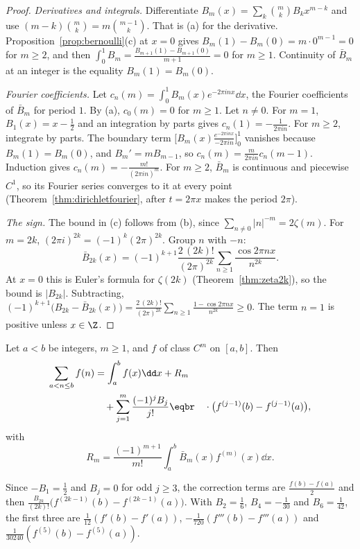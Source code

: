 \begin{proof}
\emph{Derivatives and integrals.} Differentiate $B_m(x)=\sum_k\binom mkB_kx^{m-k}$ and use $(m-k)\binom mk=m\binom{m-1}k$. That is (a) for the derivative. Proposition~\ref{prop:bernoulli}(c) at $x=0$ gives $B_m(1)-B_m(0)=m\cdot0^{m-1}=0$ for $m\ge2$, and then $\int_0^1B_m=\frac{B_{m+1}(1)-B_{m+1}(0)}{m+1}=0$ for $m\ge1$. Continuity of $\bar B_m$ at an integer is the equality $B_m(1)=B_m(0)$.

\emph{Fourier coefficients.} Let $c_n(m)=\int_0^1B_m(x)e^{-2\pi inx}\dd x$, the Fourier coefficients of $\bar B_m$ for period $1$. By (a), $c_0(m)=0$ for $m\ge1$. Let $n\ne0$. For $m=1$, $B_1(x)=x-\frac12$ and an integration by parts gives $c_n(1)=-\frac1{2\pi in}$. For $m\ge2$, integrate by parts. The boundary term $\bigl[B_m(x)\frac{e^{-2\pi inx}}{-2\pi in}\bigr]_0^1$ vanishes because $B_m(1)=B_m(0)$, and $B_m'=mB_{m-1}$, so $c_n(m)=\frac m{2\pi in}c_n(m-1)$. Induction gives $c_n(m)=-\frac{m!}{(2\pi in)^m}$. For $m\ge2$, $\bar B_m$ is continuous and piecewise $C^1$, so its Fourier series converges to it at every point (Theorem~\ref{thm:dirichletfourier}, after $t=2\pi x$ makes the period $2\pi$).

\emph{The sign.} The bound in (c) follows from (b), since $\sum_{n\ne0}|n|^{-m}=2\zeta(m)$. For $m=2k$, $(2\pi i)^{2k}=(-1)^k(2\pi)^{2k}$. Group $n$ with $-n$:
\[
\bar B_{2k}(x)=(-1)^{k+1}\frac{2\,(2k)!}{(2\pi)^{2k}}\sum_{n\ge1}\frac{\cos2\pi nx}{n^{2k}}.
\]
At $x=0$ this is Euler's formula for $\zeta(2k)$ (Theorem~\ref{thm:zeta2k}), so the bound is $|B_{2k}|$. Subtracting,
$(-1)^{k+1}\bigl(B_{2k}-\bar B_{2k}(x)\bigr)=\frac{2\,(2k)!}{(2\pi)^{2k}}\sum_{n\ge1}\frac{1-\cos2\pi nx}{n^{2k}}\ge0$. The term $n=1$ is positive unless $x\in\Z$.
\end{proof}

\begin{theorem}\label{thm:eulermaclaurin}
Let $a<b$ be integers, $m\ge1$, and $f$ of class $C^m$ on $[a,b]$. Then
\[
\begin{aligned}\sum_{a<n\le b}f(n)&=\int_a^bf(x)\dd x+R_m\\&\quad+\sum_{j=1}^m\frac{(-1)^jB_j}{j!}\eqbr\quad\cdot\bigl(f^{(j-1)}(b)-f^{(j-1)}(a)\bigr),\end{aligned}
\]
with
\[
R_m=\frac{(-1)^{m+1}}{m!}\int_a^b\bar B_m(x)f^{(m)}(x)\dd x.
\]
\end{theorem}

Since $-B_1=\frac12$ and $B_j=0$ for odd $j\ge3$, the correction terms are $\frac{f(b)-f(a)}2$ and then $\frac{B_{2k}}{(2k)!}\bigl(f^{(2k-1)}(b)-f^{(2k-1)}(a)\bigr)$. With $B_2=\frac16$, $B_4=-\frac1{30}$ and $B_6=\frac1{42}$, the first three are $\frac1{12}(f'(b)-f'(a))$, $-\frac1{720}(f'''(b)-f'''(a))$ and $\frac1{30240}(f^{(5)}(b)-f^{(5)}(a))$.

